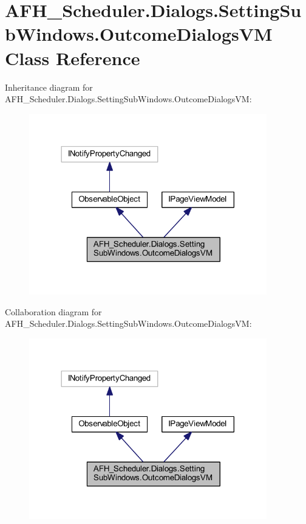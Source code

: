 \section{A\+F\+H\+\_\+\+Scheduler.\+Dialogs.\+Setting\+Sub\+Windows.\+Outcome\+Dialogs\+VM Class Reference}
\label{class_a_f_h___scheduler_1_1_dialogs_1_1_setting_sub_windows_1_1_outcome_dialogs_v_m}


Inheritance diagram for A\+F\+H\+\_\+\+Scheduler.\+Dialogs.\+Setting\+Sub\+Windows.\+Outcome\+Dialogs\+VM\+:
\nopagebreak
\begin{figure}[H]
\begin{center}
\leavevmode
\includegraphics[width=293pt]{class_a_f_h___scheduler_1_1_dialogs_1_1_setting_sub_windows_1_1_outcome_dialogs_v_m__inherit__graph}
\end{center}
\end{figure}


Collaboration diagram for A\+F\+H\+\_\+\+Scheduler.\+Dialogs.\+Setting\+Sub\+Windows.\+Outcome\+Dialogs\+VM\+:
\nopagebreak
\begin{figure}[H]
\begin{center}
\leavevmode
\includegraphics[width=293pt]{class_a_f_h___scheduler_1_1_dialogs_1_1_setting_sub_windows_1_1_outcome_dialogs_v_m__coll__graph}
\end{center}
\end{figure}
